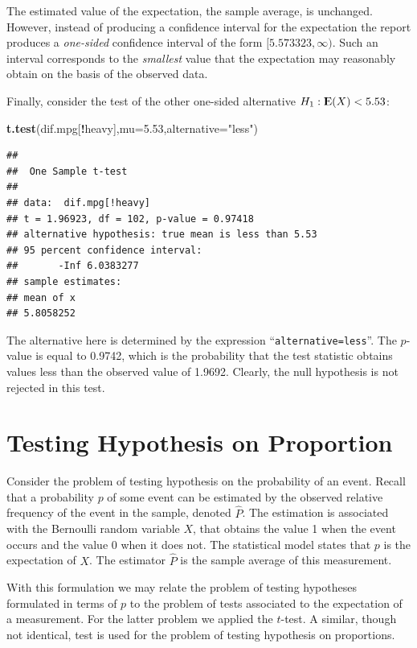 \documentclass[]{krantz}
\makeatletter
\newenvironment{Shaded}{\begin{snugshade}}{\end{snugshade}}
\newcommand{\KeywordTok}[1]{\textcolor[rgb]{0.13,0.29,0.53}{\textbf{#1}}}
\newcommand{\DataTypeTok}[1]{\textcolor[rgb]{0.13,0.29,0.53}{#1}}
\newcommand{\FloatTok}[1]{\textcolor[rgb]{0.00,0.00,0.81}{#1}}
\newcommand{\StringTok}[1]{\textcolor[rgb]{0.31,0.60,0.02}{#1}}
\newcommand{\OperatorTok}[1]{\textcolor[rgb]{0.81,0.36,0.00}{\textbf{#1}}}
\newcommand{\NormalTok}[1]{#1}
\newcommand{\Expec}{{\rm I\kern-.3em E}}
\newenvironment{kframe}{%
\medskip{}
\setlength{\fboxsep}{.8em}
 \def\at@end@of@kframe{}%
 \ifinner\ifhmode%
  \def\at@end@of@kframe{\end{minipage}}%
  \begin{minipage}{\columnwidth}%
 \fi\fi%
 \def\FrameCommand##1{\hskip\@totalleftmargin \hskip-\fboxsep
 \colorbox{shadecolor}{##1}\hskip-\fboxsep
     \hskip-\linewidth \hskip-\@totalleftmargin \hskip\columnwidth}%
 \MakeFramed {\advance\hsize-\width
   \@totalleftmargin\z@ \linewidth\hsize
   \@setminipage}}%
 {\par\unskip\endMakeFramed%
 \at@end@of@kframe}
\renewenvironment{Shaded}{\begin{kframe}}{\end{kframe}}
\theoremstyle{definition}
\theoremstyle{definition}
\theoremstyle{definition}
\theoremstyle{remark}
\makeatother
\begin{document}
The estimated value of the expectation, the sample average, is
unchanged. However, instead of producing a confidence interval for the
expectation the report produces a \emph{one-sided} confidence interval
of the form \([5.573323, \infty)\). Such an interval corresponds to the
\emph{smallest} value that the expectation may reasonably obtain on the
basis of the observed data.

Finally, consider the test of the other one-sided alternative
\(H_1:\Expec(X) < 5.53\):

\begin{Shaded}
\begin{Highlighting}[]
\KeywordTok{t.test}\NormalTok{(dif.mpg[}\OperatorTok{!}\NormalTok{heavy],}\DataTypeTok{mu=}\FloatTok{5.53}\NormalTok{,}\DataTypeTok{alternative=}\StringTok{"less"}\NormalTok{)}
\end{Highlighting}
\end{Shaded}

\begin{verbatim}
## 
##  One Sample t-test
## 
## data:  dif.mpg[!heavy]
## t = 1.96923, df = 102, p-value = 0.97418
## alternative hypothesis: true mean is less than 5.53
## 95 percent confidence interval:
##       -Inf 6.0383277
## sample estimates:
## mean of x 
## 5.8058252
\end{verbatim}

The alternative here is determined by the expression
``\texttt{alternative=less}''. The \(p\)-value is equal to 0.9742, which
is the probability that the test statistic obtains values less than the
observed value of 1.9692. Clearly, the null hypothesis is not rejected
in this test.

\section{Testing Hypothesis on Proportion}\label{TestFrac}

Consider the problem of testing hypothesis on the probability of an
event. Recall that a probability \(p\) of some event can be estimated by
the observed relative frequency of the event in the sample, denoted
\(\hat P\). The estimation is associated with the Bernoulli random
variable \(X\), that obtains the value 1 when the event occurs and the
value 0 when it does not. The statistical model states that \(p\) is the
expectation of \(X\). The estimator \(\hat P\) is the sample average of
this measurement.

With this formulation we may relate the problem of testing hypotheses
formulated in terms of \(p\) to the problem of tests associated to the
expectation of a measurement. For the latter problem we applied the
\(t\)-test. A similar, though not identical, test is used for the
problem of testing hypothesis on proportions.
\end{document}
